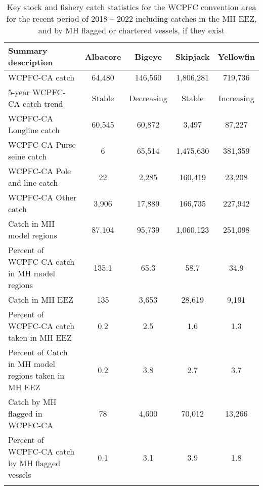 \begin{longtable}{lcccc}
\caption{Key stock and fishery catch statistics for the WCPFC convention area for the recent period of 2018 -- 2022 including catches in the MH EEZ, and by MH flagged or chartered vessels, if they exist} \\ 
  \hline
Summary description & Albacore & Bigeye & Skipjack & Yellowfin \\ 
  \hline
WCPFC-CA catch & 64,480 & 146,560 & 1,806,281 & 719,736 \\ 
  5-year WCPFC-CA catch trend & Stable & Decreasing & Stable & Increasing \\ 
  WCPFC-CA Longline catch & 60,545 & 60,872 & 3,497 & 87,227 \\ 
  WCPFC-CA Purse seine catch & 6 & 65,514 & 1,475,630 & 381,359 \\ 
  WCPFC-CA Pole and line catch & 22 & 2,285 & 160,419 & 23,208 \\ 
  WCPFC-CA Other catch & 3,906 & 17,889 & 166,735 & 227,942 \\ 
  Catch in MH model regions & 87,104 & 95,739 & 1,060,123 & 251,098 \\ 
  Percent of WCPFC-CA catch in MH model regions & 135.1 & 65.3 & 58.7 & 34.9 \\ 
   \hline
Catch in MH EEZ & 135 & 3,653 & 28,619 & 9,191 \\ 
  Percent of WCPFC-CA catch taken in MH EEZ & 0.2 & 2.5 & 1.6 & 1.3 \\ 
  Percent of Catch in MH model regions taken in MH EEZ & 0.2 & 3.8 & 2.7 & 3.7 \\ 
  Catch by MH flagged in WCPFC-CA & 78 & 4,600 & 70,012 & 13,266 \\ 
  Percent of WCPFC-CA catch by MH flagged vessels & 0.1 & 3.1 & 3.9 & 1.8 \\ 
  \hline
\label{cat_sum_tab}
\end{longtable}
